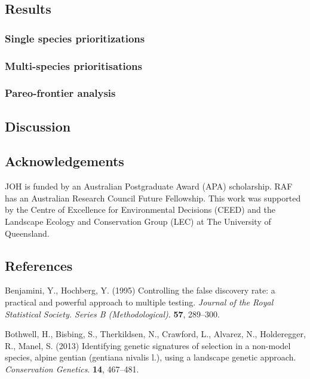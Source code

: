 \documentclass[11pt,]{article}
\begin{document}
\subsection{Results}\label{results}

\subsubsection{Single species
prioritizations}\label{single-species-prioritizations}

\subsubsection{Multi-species
prioritisations}\label{multi-species-prioritisations}

\subsubsection{Pareo-frontier analysis}\label{pareo-frontier-analysis}

\subsection{Discussion}\label{discussion}

\subsection{Acknowledgements}\label{acknowledgements}

JOH is funded by an Australian Postgraduate Award (APA) scholarship. RAF
has an Australian Research Council Future Fellowship. This work was
supported by the Centre of Excellence for Environmental Decisions (CEED)
and the Landscape Ecology and Conservation Group (LEC) at The University
of Queensland.

\subsection{References}\label{references}

Benjamini, Y., Hochberg, Y. (1995) Controlling the false discovery rate:
a practical and powerful approach to multiple testing. \emph{Journal of
the Royal Statistical Society. Series B (Methodological)}. \textbf{57},
289--300.

Bothwell, H., Bisbing, S., Therkildsen, N., Crawford, L., Alvarez, N.,
Holderegger, R., Manel, S. (2013) Identifying genetic signatures of
selection in a non-model species, alpine gentian (gentiana nivalis l.),
using a landscape genetic approach. \emph{Conservation Genetics}.
\textbf{14}, 467--481.
\end{document}
